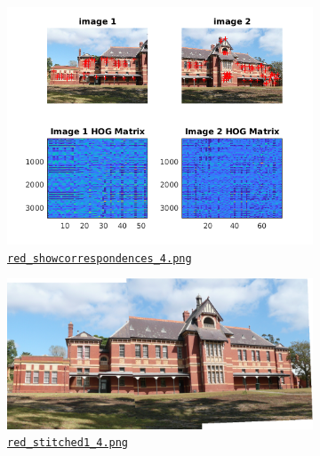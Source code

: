 \begin{figure}[htbp]
	\centering
	\begin{subfigure}[t]{0.4\textwidth}
	    \centering
		\includegraphics[width=\textwidth]{hw2/problem3/red_showcorrespondences_4.png}
		\caption{\href{./hw2/problem3/red_showcorrespondences_4.png}{\texttt{red\_showcorrespondences\_4.png}}}\label{fig:8a}
	\end{subfigure}
	\qquad
	\begin{subfigure}[t]{0.4\textwidth}
	    \centering
		\includegraphics[width=\textwidth]{hw2/problem3/red_stitched1_4.png}
		\caption{\href{./hw2/problem3/red_stitched1_4.png}{\texttt{red\_stitched1\_4.png}}}\label{fig:8b}
	\end{subfigure}
	\begin{subfigure}[t]{0.4\textwidth}
	    \centering

\end{subfigure}
\end{figure}
